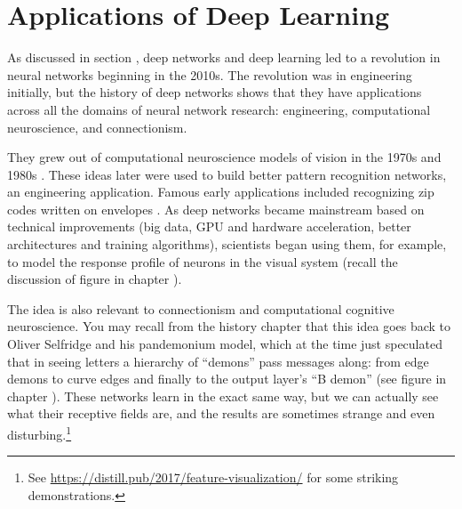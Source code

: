 \section{Applications of Deep Learning}

As discussed in section , deep networks and deep learning led to a revolution in neural networks beginning in the 2010s. The revolution was in engineering initially, but the history of deep networks shows that they have applications across all the domains of neural network research: engineering, computational neuroscience, and connectionism. 

They grew out of computational neuroscience models of vision in the 1970s and 1980s \cite{fukushima1982neocognitron}.  These ideas later were used to build better pattern recognition networks, an engineering application. Famous early applications included recognizing zip codes written on envelopes \cite{lecun1989backpropagation}. As deep networks became mainstream based on technical improvements (big data, GPU and hardware acceleration, better architectures and training algorithms), scientists began using them, for example, to model the response profile of neurons in the visual system (recall the discussion of figure  in chapter ). 

The idea is also relevant to connectionism and computational cognitive neuroscience. You may recall from the history chapter that this idea goes  back to Oliver Selfridge and his pandemonium model, which at the time just speculated that in seeing letters a hierarchy of ``demons'' pass messages along: from edge demons to curve edges and finally to the output layer's ``B demon'' (see figure  in chapter ). These networks learn in the exact same way, but we can actually  see what their receptive fields are, and the results are sometimes strange and even disturbing.\footnote{See \url{https://distill.pub/2017/feature-visualization/} for some striking demonstrations.} 
